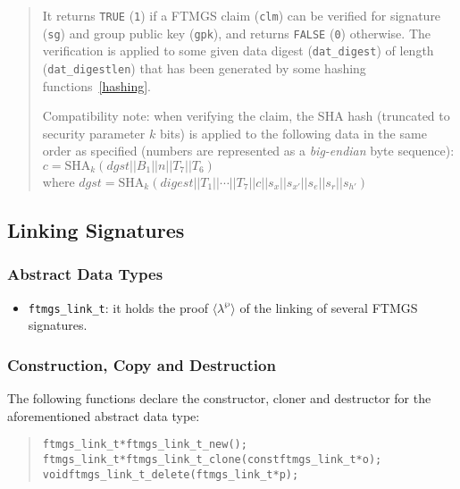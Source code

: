 \documentclass[a4paper]{article}
\newenvironment{code}%
{\begin{quote}\footnotesize\begin{alltt}}%
{\end{alltt}\end{quote}}%
\newcommand{\tuple}[1]{\ensuremath{\langle #1 \rangle}}
\begin{document}
\begin{quote}\footnotesize
It returns \verb|TRUE| (\verb|1|) if a FTMGS claim (\verb|clm|) can be
verified for signature (\verb|sg|) and group public key (\verb|gpk|),
and returns \verb|FALSE| (\verb|0|) otherwise.  The verification is
applied to some given data digest (\verb|dat_digest|) of length
(\verb|dat_digestlen|) that has been generated by some hashing
functions~\ref{hashing}.

Compatibility note: when verifying the claim, the SHA hash
(truncated to security parameter $k$ bits) is applied to the following
data in the same order as specified (numbers are represented as a
\emph{big-endian} byte sequence):\\ {$c =
  \mathrm{SHA}_k(\mathit{dgst}||B_1||n||T_7||T_6)$}
\\ where 
$\mathit{dgst} = \mathrm{SHA}_k(\mathit{digest}||T_1||\cdots||T_7||c||s_x||s_{x'}||s_e||s_r||s_{h'})$
\end{quote}

\subsection{Linking Signatures}

\subsubsection*{Abstract Data Types}
\begin{itemize}\small
\item \verb|ftmgs_link_t|: it holds the proof \tuple{\lambda^{\wp}} of
  the linking of several FTMGS signatures.
\end{itemize}
\subsubsection*{Construction, Copy and Destruction}
The following functions declare the constructor, cloner and destructor
for the aforementioned abstract data type:
\begin{code}
ftmgs_link_t* ftmgs_link_t_new();
ftmgs_link_t* ftmgs_link_t_clone(const ftmgs_link_t* o);
void ftmgs_link_t_delete(ftmgs_link_t* p);
\end{code}
\end{document}
